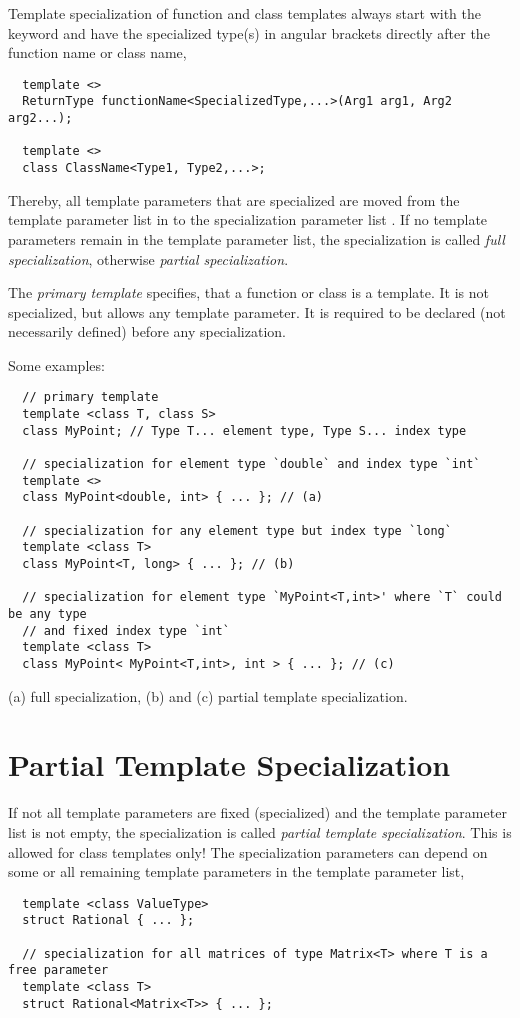 Template specialization of function and class templates always start with the keyword  and have the specialized type(s) in angular brackets
directly after the function name or class name, \eg
%
\begin{verbatim}
  template <>
  ReturnType functionName<SpecializedType,...>(Arg1 arg1, Arg2 arg2...);

  template <>
  class ClassName<Type1, Type2,...>;
\end{verbatim}
%
Thereby, all template parameters that are specialized are moved from the template parameter list in  to the specialization parameter list
. If no template parameters remain in the template parameter list, the specialization is called \emph{full specialization},
otherwise \emph{partial specialization}.

The \emph{primary template} specifies, that a function or class is a template. It is not specialized, but allows any template parameter. It is required to be
declared (not necessarily defined) before any specialization.

Some examples:
\begin{verbatim}
  // primary template
  template <class T, class S>
  class MyPoint; // Type T... element type, Type S... index type

  // specialization for element type `double` and index type `int`
  template <>
  class MyPoint<double, int> { ... }; // (a)

  // specialization for any element type but index type `long`
  template <class T>
  class MyPoint<T, long> { ... }; // (b)

  // specialization for element type `MyPoint<T,int>' where `T` could be any type
  // and fixed index type `int`
  template <class T>
  class MyPoint< MyPoint<T,int>, int > { ... }; // (c)
\end{verbatim}
(a) full specialization, (b) and (c) partial template specialization.


\section{Partial Template Specialization}\label{seq:partial_template_specialization}
If not all template parameters are fixed (specialized) and the template parameter list is not empty, the specialization is called
\emph{partial template specialization}. This is allowed for class templates only! The specialization parameters can depend on some or all remaining
template parameters in the template parameter list, \eg
%
\begin{verbatim}
  template <class ValueType>
  struct Rational { ... };

  // specialization for all matrices of type Matrix<T> where T is a free parameter
  template <class T>
  struct Rational<Matrix<T>> { ... };
\end{verbatim}

